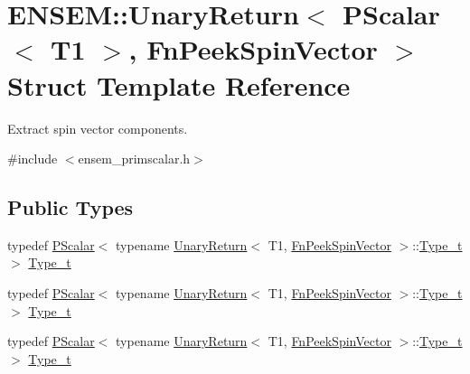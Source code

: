 \hypertarget{structENSEM_1_1UnaryReturn_3_01PScalar_3_01T1_01_4_00_01FnPeekSpinVector_01_4}{}\section{E\+N\+S\+EM\+:\+:Unary\+Return$<$ P\+Scalar$<$ T1 $>$, Fn\+Peek\+Spin\+Vector $>$ Struct Template Reference}
\label{structENSEM_1_1UnaryReturn_3_01PScalar_3_01T1_01_4_00_01FnPeekSpinVector_01_4}


Extract spin vector components.  




{\ttfamily \#include $<$ensem\+\_\+primscalar.\+h$>$}

\subsection*{Public Types}
\begin{DoxyCompactItemize}
\item 
typedef \mbox{\hyperlink{classENSEM_1_1PScalar}{P\+Scalar}}$<$ typename \mbox{\hyperlink{structENSEM_1_1UnaryReturn}{Unary\+Return}}$<$ T1, \mbox{\hyperlink{structENSEM_1_1FnPeekSpinVector}{Fn\+Peek\+Spin\+Vector}} $>$\+::\mbox{\hyperlink{structENSEM_1_1UnaryReturn_3_01PScalar_3_01T1_01_4_00_01FnPeekSpinVector_01_4_ac623af45f4638d6db8fefb084c447ef0}{Type\+\_\+t}} $>$ \mbox{\hyperlink{structENSEM_1_1UnaryReturn_3_01PScalar_3_01T1_01_4_00_01FnPeekSpinVector_01_4_ac623af45f4638d6db8fefb084c447ef0}{Type\+\_\+t}}
\item 
typedef \mbox{\hyperlink{classENSEM_1_1PScalar}{P\+Scalar}}$<$ typename \mbox{\hyperlink{structENSEM_1_1UnaryReturn}{Unary\+Return}}$<$ T1, \mbox{\hyperlink{structENSEM_1_1FnPeekSpinVector}{Fn\+Peek\+Spin\+Vector}} $>$\+::\mbox{\hyperlink{structENSEM_1_1UnaryReturn_3_01PScalar_3_01T1_01_4_00_01FnPeekSpinVector_01_4_ac623af45f4638d6db8fefb084c447ef0}{Type\+\_\+t}} $>$ \mbox{\hyperlink{structENSEM_1_1UnaryReturn_3_01PScalar_3_01T1_01_4_00_01FnPeekSpinVector_01_4_ac623af45f4638d6db8fefb084c447ef0}{Type\+\_\+t}}
\item 
typedef \mbox{\hyperlink{classENSEM_1_1PScalar}{P\+Scalar}}$<$ typename \mbox{\hyperlink{structENSEM_1_1UnaryReturn}{Unary\+Return}}$<$ T1, \mbox{\hyperlink{structENSEM_1_1FnPeekSpinVector}{Fn\+Peek\+Spin\+Vector}} $>$\+::\mbox{\hyperlink{structENSEM_1_1UnaryReturn_3_01PScalar_3_01T1_01_4_00_01FnPeekSpinVector_01_4_ac623af45f4638d6db8fefb084c447ef0}{Type\+\_\+t}} $>$ \mbox{\hyperlink{structENSEM_1_1UnaryReturn_3_01PScalar_3_01T1_01_4_00_01FnPeekSpinVector_01_4_ac623af45f4638d6db8fefb084c447ef0}{Type\+\_\+t}}
\end{DoxyCompactItemize}


